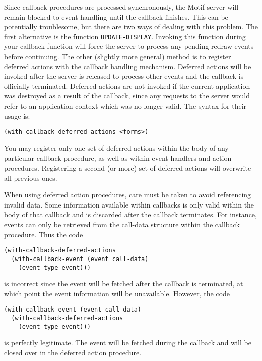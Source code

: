 \documentclass{article}
\begin{document}
Since callback procedures are processed synchronously, the Motif
server will remain blocked to event handling until the callback
finishes.  This can be potentially troublesome, but there are two ways
of dealing with this problem.  The first alternative is the function
\texttt{UPDATE-DISPLAY}.  Invoking this function during your callback
function will force the server to process any pending redraw events
before continuing.  The other (slightly more general) method is to
register deferred actions with the callback handling mechanism.
Deferred actions will be invoked after the server is released to
process other events and the callback is officially terminated.
Deferred actions are not invoked if the current application was
destroyed as a result of the callback, since any requests to the
server would refer to an application context which was no longer
valid.  The syntax for their usage is:

\begin{verbatim}
(with-callback-deferred-actions <forms>)
\end{verbatim}

You may register only one set of deferred actions within the body of
any particular callback procedure, as well as within event handlers
and action procedures.  Registering a second (or more) set of deferred
actions will overwrite all previous ones.

When using deferred action procedures, care must be taken to avoid
referencing invalid data.  Some information available within callbacks
is only valid within the body of that callback and is discarded after
the callback terminates.  For instance, events can only be retrieved
from the call-data structure within the callback procedure.  Thus the
code

\begin{verbatim}
(with-callback-deferred-actions
  (with-callback-event (event call-data)
    (event-type event)))
\end{verbatim}

is incorrect since the event will be fetched after the callback is
terminated, at which point the event information will be unavailable.
However, the code

\begin{verbatim}
(with-callback-event (event call-data)
  (with-callback-deferred-actions
    (event-type event)))
\end{verbatim}

is perfectly legitimate.  The event will be fetched during the callback and
will be closed over in the deferred action procedure.
\end{document}
